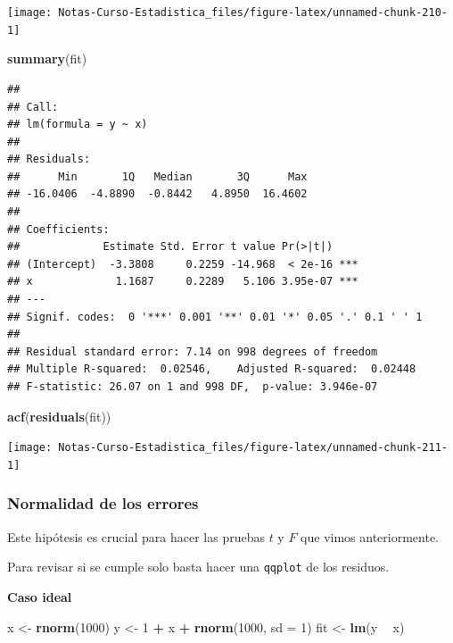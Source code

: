 \documentclass[
  12pt,
]{book}
\newenvironment{Shaded}{\begin{snugshade}}{\end{snugshade}}
\newcommand{\DataTypeTok}[1]{\textcolor[rgb]{0.13,0.29,0.53}{#1}}
\newcommand{\DecValTok}[1]{\textcolor[rgb]{0.00,0.00,0.81}{#1}}
\newcommand{\KeywordTok}[1]{\textcolor[rgb]{0.13,0.29,0.53}{\textbf{#1}}}
\newcommand{\NormalTok}[1]{#1}
\newcommand{\OperatorTok}[1]{\textcolor[rgb]{0.81,0.36,0.00}{\textbf{#1}}}
\newcommand{\StringTok}[1]{\textcolor[rgb]{0.31,0.60,0.02}{#1}}
\theoremstyle{definition}
\theoremstyle{definition}
\theoremstyle{definition}
\theoremstyle{remark}
\begin{document}
\begin{center}\texttt{[image: Notas-Curso-Estadistica\_files/figure-latex/unnamed-chunk-210-1]} \end{center}

\begin{Shaded}
\begin{Highlighting}[]
\KeywordTok{summary}\NormalTok{(fit)}
\end{Highlighting}
\end{Shaded}

\begin{verbatim}
## 
## Call:
## lm(formula = y ~ x)
## 
## Residuals:
##      Min       1Q   Median       3Q      Max 
## -16.0406  -4.8890  -0.8442   4.8950  16.4602 
## 
## Coefficients:
##             Estimate Std. Error t value Pr(>|t|)    
## (Intercept)  -3.3808     0.2259 -14.968  < 2e-16 ***
## x             1.1687     0.2289   5.106 3.95e-07 ***
## ---
## Signif. codes:  0 '***' 0.001 '**' 0.01 '*' 0.05 '.' 0.1 ' ' 1
## 
## Residual standard error: 7.14 on 998 degrees of freedom
## Multiple R-squared:  0.02546,    Adjusted R-squared:  0.02448 
## F-statistic: 26.07 on 1 and 998 DF,  p-value: 3.946e-07
\end{verbatim}

\begin{Shaded}
\begin{Highlighting}[]
\KeywordTok{acf}\NormalTok{(}\KeywordTok{residuals}\NormalTok{(fit))}
\end{Highlighting}
\end{Shaded}

\begin{center}\texttt{[image: Notas-Curso-Estadistica\_files/figure-latex/unnamed-chunk-211-1]} \end{center}

\hypertarget{normalidad-de-los-errores}{%
\subsubsection{Normalidad de los errores}\label{normalidad-de-los-errores}}

Este hipótesis es crucial para hacer las pruebas \(t\) y \(F\) que vimos anteriormente.

Para revisar si se cumple solo basta hacer una \texttt{qqplot} de los residuos.

\textbf{Caso ideal}

\begin{Shaded}
\begin{Highlighting}[]
\NormalTok{x <-}\StringTok{ }\KeywordTok{rnorm}\NormalTok{(}\DecValTok{1000}\NormalTok{)}
\NormalTok{y <-}\StringTok{ }\DecValTok{1} \OperatorTok{+}\StringTok{ }\NormalTok{x }\OperatorTok{+}\StringTok{ }\KeywordTok{rnorm}\NormalTok{(}\DecValTok{1000}\NormalTok{, }\DataTypeTok{sd =} \DecValTok{1}\NormalTok{)}
\NormalTok{fit <-}\StringTok{ }\KeywordTok{lm}\NormalTok{(y }\OperatorTok{~}\StringTok{ }\NormalTok{x)}
\end{Highlighting}
\end{Shaded}
\end{document}
